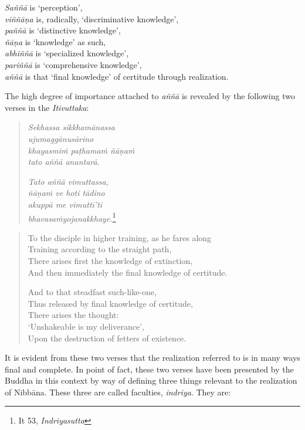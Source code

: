 \emph{Saññā} is `perception',\\
\emph{viññāṇa} is, radically, `discriminative knowledge',\\
\emph{paññā} is `distinctive knowledge',\\
\emph{ñāṇa} is `knowledge' as such,\\
\emph{abhiññā} is `specialized knowledge',\\
\emph{pariññā} is `comprehensive knowledge',\\
\emph{aññā} is that `final knowledge' of certitude through realization.

The high degree of importance attached to \emph{aññā} is revealed by the following two verses in the \emph{Itivuttaka}:

\begin{quote}
\emph{Sekhassa sikkhamānassa}\\
\emph{ujumaggānusārino}\\
\emph{khayasmiṁ paṭhamaṁ ñāṇaṁ}\\
\emph{tato aññā anantarā}.

\emph{Tato aññā vimuttassa,}\\
\emph{ñāṇaṁ ve hoti tādino}\\
\emph{akuppā me vimuttī'ti}\\
\emph{bhavasaṁyojanakkhaye.}\footnote{It 53, \emph{Indriyasutta}}
\end{quote}

\begin{quote}
To the disciple in higher training, as he fares along\\
Training according to the straight path,\\
There arises first the knowledge of extinction,\\
And then immediately the final knowledge of certitude.

And to that steadfast such-like-one,\\
Thus released by final knowledge of certitude,\\
There arises the thought:\\
{} `Unshakeable is my deliverance',\\
Upon the destruction of fetters of existence.
\end{quote}

It is evident from these two verses that the realization referred to is in many ways final and complete. In point of fact, these two verses have been presented by the Buddha in this context by way of defining three things relevant to the realization of Nibbāna. These three are called faculties, \emph{indriya}. They are:

